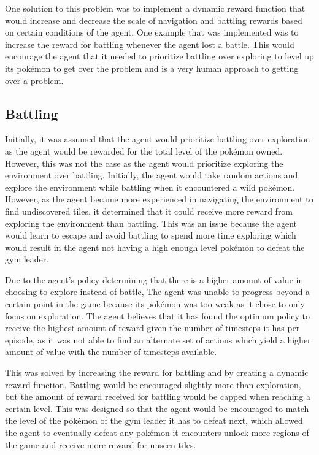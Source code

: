 One solution to this problem was to implement a dynamic reward function that would increase and decrease the scale of navigation and battling rewards based on certain conditions of the agent. One example that was implemented was to increase the reward for battling whenever the agent lost a battle. This would encourage the agent that it needed to prioritize battling over exploring to level up its pokémon to get over the problem and is a very human approach to getting over a problem. 

\subsection{Battling}

Initially, it was assumed that the agent would prioritize battling over exploration as the agent would be rewarded for the total level of the pokémon owned. However, this was not the case as the agent would prioritize exploring the environment over battling. Initially, the agent would take random actions and explore the environment while battling when it encountered a wild pokémon. However, as the agent became more experienced in navigating the environment to find undiscovered tiles, it determined that it could receive more reward from exploring the environment than battling. This was an issue because the agent would learn to escape and avoid battling to spend more time exploring which would result in the agent not having a high enough level pokémon to defeat the gym leader. 

Due to the agent's policy determining that there is a higher amount of value in choosing to explore instead of battle, The agent was unable to progress beyond a certain point in the game because its pokémon was too weak as it chose to only focus on exploration. The agent believes that it has found the optimum policy to receive the highest amount of reward given the number of timesteps it has per episode, as it was not able to find an alternate set of actions which yield a higher amount of value with the number of timesteps available. 

This was solved by increasing the reward for battling and by creating a dynamic reward function. Battling would be encouraged slightly more than exploration, but the amount of reward received for battling would be capped when reaching a certain level. This was designed so that the agent would be encouraged to match the level of the pokémon of the gym leader it has to defeat next, which allowed the agent to eventually defeat any pokémon it encounters unlock more regions of the game and receive more reward for unseen tiles.

